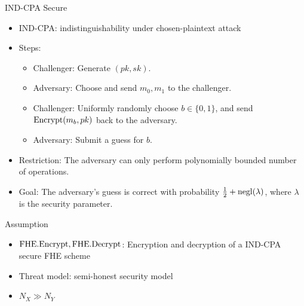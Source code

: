 \begin{frame}{IND-CPA Secure}
\begin{itemize}
\item IND-CPA: indistinguishability under chosen-plaintext attack
\item Steps:
\begin{itemize}
\item Challenger: Generate $(pk, sk)$.
\item Adversary: Choose and send $m_0, m_1$ to the challenger.
\item Challenger: Uniformly randomly choose $b\in\{0, 1\}$, and send $\mathrm{Encrypt}(m_b, pk)$ back to the adversary.
\item Adversary: Submit a guess for $b$.
\end{itemize}
\item Restriction: The adversary can only perform polynomially bounded number of operations.
\item Goal: The adversary's guess is correct with probability $\frac12+\mathrm{negl}(\lambda)$, where $\lambda$ is the security parameter.
\end{itemize}
\end{frame}

\begin{frame}{Assumption}
\begin{itemize}
\item $\mathrm{FHE.Encrypt}, \mathrm{FHE.Decrypt}$: Encryption and decryption of a IND-CPA secure FHE scheme
\item Threat model: semi-honest security model
\item $N_X\gg N_Y$
\end{itemize}
\end{frame}

